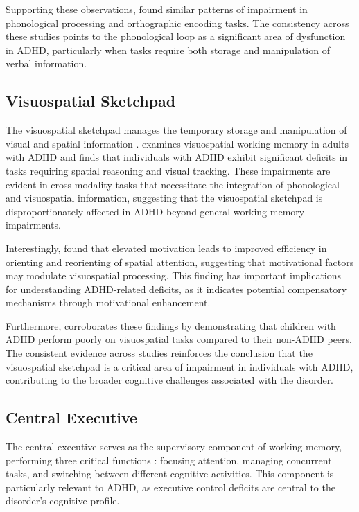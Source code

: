 \documentclass[stu]{apa7}
\begin{document}
Supporting these observations, \textcite{raiker_phonological_2019} found similar patterns of impairment in phonological processing and orthographic encoding tasks. The consistency across these studies points to the phonological loop as a significant area of dysfunction in ADHD, particularly when tasks require both storage and manipulation of verbal information.

\subsection{Visuospatial Sketchpad}


The visuospatial sketchpad manages the temporary storage and manipulation of visual and spatial information \parencite{baddeley_developments_1994}. \textcite{butzbach_basic_2019} examines visuospatial working memory in adults with ADHD and finds that individuals with ADHD exhibit significant deficits in tasks requiring spatial reasoning and visual tracking. These impairments are evident in cross-modality tasks that necessitate the integration of phonological and visuospatial information, suggesting that the visuospatial sketchpad is disproportionately affected in ADHD beyond general working memory impairments.

Interestingly, \textcite{engelmann_motivation_2007} found that elevated motivation leads to improved efficiency in orienting and reorienting of spatial attention, suggesting that motivational factors may modulate visuospatial processing. This finding has important implications for understanding ADHD-related deficits, as it indicates potential compensatory mechanisms through motivational enhancement.

Furthermore, \textcite{elosua_differences_2017} corroborates these findings by demonstrating that children with ADHD perform poorly on visuospatial tasks compared to their non-ADHD peers. The consistent evidence across studies reinforces the conclusion that the visuospatial sketchpad is a critical area of impairment in individuals with ADHD, contributing to the broader cognitive challenges associated with the disorder.

\subsection{Central Executive}

The central executive serves as the supervisory component of working memory, performing three critical functions \parencite{baddeley_working_2012}: focusing attention, managing concurrent tasks, and switching between different cognitive activities. This component is particularly relevant to ADHD, as executive control deficits are central to the disorder's cognitive profile.
\end{document}
